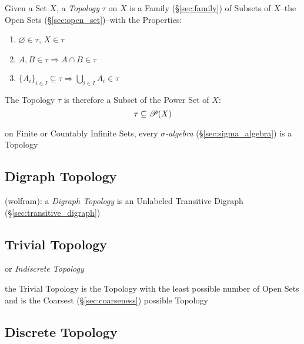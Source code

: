 Given a Set $X$, a \emph{Topology} $\tau$ on $X$ is a Family
(\S\ref{sec:family}) of Subsets of $X$--the Open Sets
(\S\ref{sec:open_set})--with the Properties:
\begin{enumerate}
  \item $\varnothing \in \tau$, $X \in \tau$
  \item $A,B \in \tau \Rightarrow A \cap B \in \tau$
  \item $\{A_i\}_{i \in I} \subseteq \tau \Rightarrow \bigcup_{i \in
  I} A_i \in \tau$
\end{enumerate}
The Topology $\tau$ is therefore a Subset of the Power Set of $X$:
\[
  \tau \subseteq \mathscr{P}(X)
\]

\fist on Finite or Countably Infinite Sets, every \emph{$\sigma$-algebra}
(\S\ref{sec:sigma_algebra}) is a Topology



\subsection{Digraph Topology}\label{sec:digraph_topology}

(wolfram): a \emph{Digraph Topology} is an Unlabeled Transitive Digraph
(\S\ref{sec:transitive_digraph})



\subsection{Trivial Topology}\label{sec:trivial_topology}

or \emph{Indiscrete Topology}

the Trivial Topology is the Topology with the least possible number of Open
Sets and is the Coarsest (\S\ref{sec:coarseness}) possible Topology



\subsection{Discrete Topology}\label{sec:discrete_topology}

